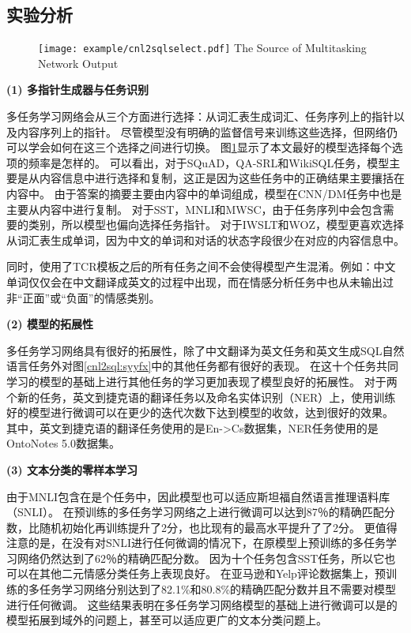 \subsection{实验分析}

\begin{figure}[!htp]
  \centering
  \texttt{[image: example/cnl2sqlselect.pdf]}
    {The Source of Multitasking Network Output}
  \label{fig:cnl2sqlselect}
\end{figure}

\textbf{(1) 多指针生成器与任务识别}

多任务学习网络会从三个方面进行选择：从词汇表生成词汇、任务序列上的指针以及内容序列上的指针。
尽管模型没有明确的监督信号来训练这些选择，但网络仍可以学会如何在这三个选择之间进行切换。
图\ref{fig:cnl2sqlselect}显示了本文最好的模型选择每个选项的频率是怎样的。
可以看出，对于SQuAD，QA-SRL和WikiSQL任务，模型主要是从内容信息中进行选择和复制，这正是因为这些任务中的正确结果主要攘括在内容中。
由于答案的摘要主要由内容中的单词组成，模型在CNN/DM任务中也是主要从内容中进行复制。
对于SST，MNLI和MWSC，由于任务序列中会包含需要的类别，所以模型也偏向选择任务指针。
对于IWSLT和WOZ，模型更喜欢选择从词汇表生成单词，因为中文的单词和对话的状态字段很少在对应的内容信息中。

同时，使用了TCR模板之后的所有任务之间不会使得模型产生混淆。例如：中文单词仅仅会在中文翻译成英文的过程中出现，而在情感分析任务中也从未输出过非“正面”或“负面”的情感类别。

\textbf{(2) 模型的拓展性}

多任务学习网络具有很好的拓展性，除了中文翻译为英文任务和英文生成SQL自然语言任务外对图\ref{cnl2sql:syyfx}中的其他任务都有很好的表现。
在这十个任务共同学习的模型的基础上进行其他任务的学习更加表现了模型良好的拓展性。
对于两个新的任务，英文到捷克语的翻译任务以及命名实体识别（NER）上，使用训练好的模型进行微调可以在更少的迭代次数下达到模型的收敛，达到很好的效果。
其中，英文到捷克语的翻译任务使用的是En->Cs数据集，NER任务使用的是OntoNotes 5.0数据集\cite{Hovy2006OntoNotes}。

\textbf{(3) 文本分类的零样本学习}

由于MNLI包含在是个任务中，因此模型也可以适应斯坦福自然语言推理语料库（SNLI）\cite{Bowman2015A}。
在预训练的多任务学习网络之上进行微调可以达到87％的精确匹配分数，比随机初始化再训练提升了2分，也比现有的最高水平提升了了2分\cite{Kim2018Semantic}。
更值得注意的是，在没有对SNLI进行任何微调的情况下，在原模型上预训练的多任务学习网络仍然达到了62％的精确匹配分数。
因为十个任务包含SST任务，所以它也可以在其他二元情感分类任务上表现良好。 
在亚马逊和Yelp评论数据集\cite{Kotzias2015From}上，预训练的多任务学习网络分别达到了82.1\%和80.8\%的精确匹配分数并且不需要对模型进行任何微调。
这些结果表明在多任务学习网络模型的基础上进行微调可以是的模型拓展到域外的问题上，甚至可以适应更广的文本分类问题上。

